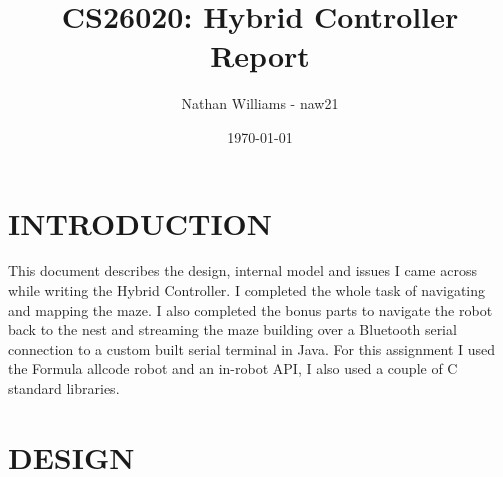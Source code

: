 \documentclass[11pt,a4paper,titlepage]{article}
\title{CS26020: Hybrid Controller Report}
\author{Nathan Williams - naw21}
\date{\today}
\begin{document}
    \maketitle
    \tableofcontents
    \listoffigures
    \section{INTRODUCTION}
        This document describes the design, internal model and issues I came across while writing the Hybrid Controller. 
        I completed the whole task of navigating and mapping the maze. 
        I also completed the bonus parts to navigate the robot back to the nest and streaming the maze building over a Bluetooth serial connection to a custom built serial terminal in Java.
        For this assignment I used the Formula allcode robot \cite{Formula all-code} and an in-robot API\cite{in-robot api}, I also used a couple of C standard libraries.
    \section{DESIGN}
\end{document}
